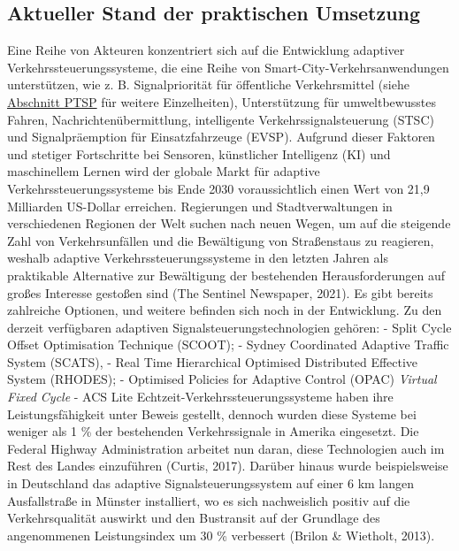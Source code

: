 \documentclass[
]{book}
\begin{document}
\hypertarget{aktueller-stand-der-praktischen-umsetzung-15}{%
\subsection*{Aktueller Stand der praktischen Umsetzung}\label{aktueller-stand-der-praktischen-umsetzung-15}}

Eine Reihe von Akteuren konzentriert sich auf die Entwicklung adaptiver Verkehrssteuerungssysteme, die eine Reihe von Smart-City-Verkehrsanwendungen unterstützen, wie z. B. Signalpriorität für öffentliche Verkehrsmittel (siehe \protect\hyperlink{public_trans_priority}{Abschnitt PTSP} für weitere Einzelheiten), Unterstützung für umweltbewusstes Fahren, Nachrichtenübermittlung, intelligente Verkehrssignalsteuerung (STSC) und Signalpräemption für Einsatzfahrzeuge (EVSP). Aufgrund dieser Faktoren und stetiger Fortschritte bei Sensoren, künstlicher Intelligenz (KI) und maschinellem Lernen wird der globale Markt für adaptive Verkehrssteuerungssysteme bis Ende 2030 voraussichtlich einen Wert von 21,9 Milliarden US-Dollar erreichen. Regierungen und Stadtverwaltungen in verschiedenen Regionen der Welt suchen nach neuen Wegen, um auf die steigende Zahl von Verkehrsunfällen und die Bewältigung von Straßenstaus zu reagieren, weshalb adaptive Verkehrssteuerungssysteme in den letzten Jahren als praktikable Alternative zur Bewältigung der bestehenden Herausforderungen auf großes Interesse gestoßen sind (The Sentinel Newspaper, 2021). Es gibt bereits zahlreiche Optionen, und weitere befinden sich noch in der Entwicklung. Zu den derzeit verfügbaren adaptiven Signalsteuerungstechnologien gehören:
- Split Cycle Offset Optimisation Technique (SCOOT);
- Sydney Coordinated Adaptive Traffic System (SCATS),
- Real Time Hierarchical Optimised Distributed Effective System (RHODES);
- Optimised Policies for Adaptive Control (OPAC) \emph{Virtual Fixed Cycle}
- ACS Lite
Echtzeit-Verkehrssteuerungssysteme haben ihre Leistungsfähigkeit unter Beweis gestellt, dennoch wurden diese Systeme bei weniger als 1 \% der bestehenden Verkehrssignale in Amerika eingesetzt. Die Federal Highway Administration arbeitet nun daran, diese Technologien auch im Rest des Landes einzuführen (Curtis, 2017). Darüber hinaus wurde beispielsweise in Deutschland das adaptive Signalsteuerungssystem auf einer 6 km langen Ausfallstraße in Münster installiert, wo es sich nachweislich positiv auf die Verkehrsqualität auswirkt und den Bustransit auf der Grundlage des angenommenen Leistungsindex um 30 \% verbessert (Brilon \& Wietholt, 2013).
\end{document}
